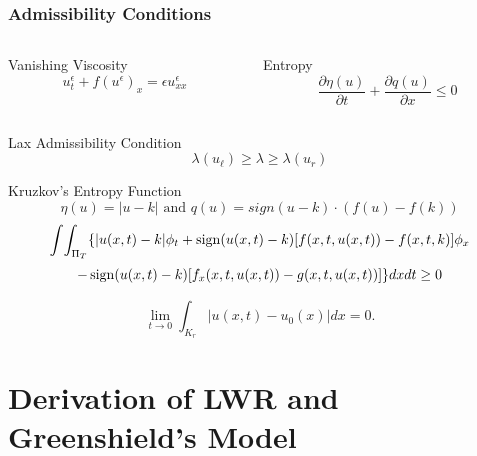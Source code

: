 \documentclass{beamer}
\begin{document}
\begin{frame}
\frametitle{Admissibility Conditions}
\scriptsize{
\begin{columns}
\begin{column}[c]{4cm}
\begin{block}{Vanishing Viscosity}
\[
	u_t^{\epsilon} + f(u^{\epsilon})_x = \epsilon u_{xx}^{\epsilon}
\]
\end{block}
\end{column}
\begin{column}[c]{4cm}
\begin{block}{Entropy}
\[
\frac{\partial \eta(u)}{\partial t} + \frac{\partial q(u)}{\partial x} \leq 0
\]
\end{block}
\end{column}
\end{columns}
\begin{block}{Lax Admissibility Condition}
\[
\lambda(u_{\ell}) \geq \lambda \geq \lambda(u_r)
\]
\end{block}
\begin{alertblock}{Kruzkov's Entropy Function}
\[
\eta(u) = \left|u - k\right| \mbox{ and } q(u) = sign(u - k)\cdot(f(u) - f(k))
\]
\[
\int\!\int_{\Pi_T} \{ |u(x,t)-k|\phi_t+\mathop{\rm sign}(u(x,t)-k)[f(x,t,
u(x,t))-f(x,t,k)]\phi_x
\]
\[
-\mathop{\rm sign}(u(x,t)-k)[f_x(x,t, u(x,t))-g(x,t, u(x,t))]\}dxdt\geq 0  \]

\[
\lim_{t\to 0}\int_{K_r}|u(x,t)-u_0(x)|dx=0.
\]
\end{alertblock}
}
\end{frame}



\section{Derivation of LWR and Greenshield's Model}


\end{document}
